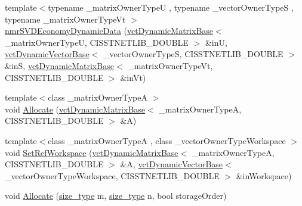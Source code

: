 \begin{DoxyCompactItemize}
\item 
{\footnotesize template$<$typename \+\_\+matrix\+Owner\+Type\+U , typename \+\_\+vector\+Owner\+Type\+S , typename \+\_\+matrix\+Owner\+Type\+Vt $>$ }\\\hyperlink{classnmr_s_v_d_economy_dynamic_data_a0ff8719e0511570efb6a9f405e26b1ab}{nmr\+S\+V\+D\+Economy\+Dynamic\+Data} (\hyperlink{classvct_dynamic_matrix_base}{vct\+Dynamic\+Matrix\+Base}$<$ \+\_\+matrix\+Owner\+Type\+U, C\+I\+S\+S\+T\+N\+E\+T\+L\+I\+B\+\_\+\+D\+O\+U\+B\+L\+E $>$ \&in\+U, \hyperlink{classvct_dynamic_vector_base}{vct\+Dynamic\+Vector\+Base}$<$ \+\_\+vector\+Owner\+Type\+S, C\+I\+S\+S\+T\+N\+E\+T\+L\+I\+B\+\_\+\+D\+O\+U\+B\+L\+E $>$ \&in\+S, \hyperlink{classvct_dynamic_matrix_base}{vct\+Dynamic\+Matrix\+Base}$<$ \+\_\+matrix\+Owner\+Type\+Vt, C\+I\+S\+S\+T\+N\+E\+T\+L\+I\+B\+\_\+\+D\+O\+U\+B\+L\+E $>$ \&in\+Vt)
\item 
{\footnotesize template$<$class \+\_\+matrix\+Owner\+Type\+A $>$ }\\void \hyperlink{classnmr_s_v_d_economy_dynamic_data_a5e651fb49ec95df60b349da9ae75825b}{Allocate} (\hyperlink{classvct_dynamic_matrix_base}{vct\+Dynamic\+Matrix\+Base}$<$ \+\_\+matrix\+Owner\+Type\+A, C\+I\+S\+S\+T\+N\+E\+T\+L\+I\+B\+\_\+\+D\+O\+U\+B\+L\+E $>$ \&A)
\item 
{\footnotesize template$<$class \+\_\+matrix\+Owner\+Type\+A , class \+\_\+vector\+Owner\+Type\+Workspace $>$ }\\void \hyperlink{classnmr_s_v_d_economy_dynamic_data_a3f26619024e95d85cf0eb278ab1c38cd}{Set\+Ref\+Workspace} (\hyperlink{classvct_dynamic_matrix_base}{vct\+Dynamic\+Matrix\+Base}$<$ \+\_\+matrix\+Owner\+Type\+A, C\+I\+S\+S\+T\+N\+E\+T\+L\+I\+B\+\_\+\+D\+O\+U\+B\+L\+E $>$ \&A, \hyperlink{classvct_dynamic_vector_base}{vct\+Dynamic\+Vector\+Base}$<$ \+\_\+vector\+Owner\+Type\+Workspace, C\+I\+S\+S\+T\+N\+E\+T\+L\+I\+B\+\_\+\+D\+O\+U\+B\+L\+E $>$ \&in\+Workspace)
\item 
void \hyperlink{classnmr_s_v_d_economy_dynamic_data_ac634e44b5fd988ecca089686b5b4bb31}{Allocate} (\hyperlink{classnmr_s_v_d_economy_dynamic_data_aee8ff15f2e92af24fdc3c7f5908770f3}{size\+\_\+type} m, \hyperlink{classnmr_s_v_d_economy_dynamic_data_aee8ff15f2e92af24fdc3c7f5908770f3}{size\+\_\+type} n, bool storage\+Order)
\item 

\end{DoxyCompactItemize}
